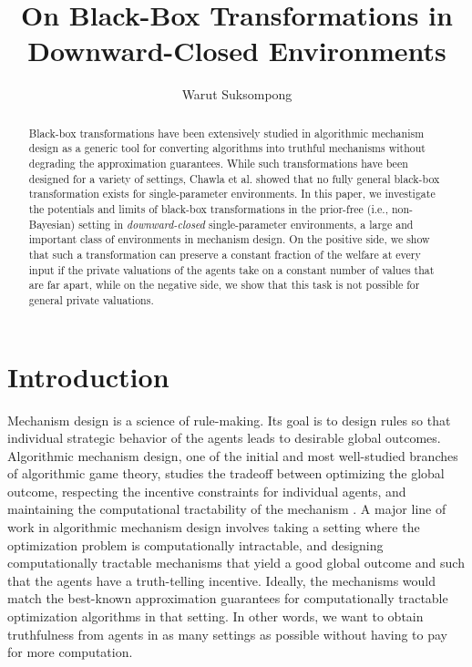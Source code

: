 \documentclass[runningheads,a4paper]{llncs}
\newcommand{\keywords}[1]{\par\addvspace\baselineskip
\noindent\keywordname\enspace\ignorespaces#1}
\begin{document}
\mainmatter  
\title{On Black-Box Transformations in Downward-Closed Environments}
\author{Warut Suksompong%
}
\maketitle

\begin{abstract}
Black-box transformations have been extensively studied in algorithmic mechanism design as a generic tool for converting algorithms into truthful mechanisms without degrading the approximation guarantees. While such transformations have been designed for a variety of settings, Chawla et al. showed that no fully general black-box transformation exists for single-parameter environments. In this paper, we investigate the potentials and limits of black-box transformations in the prior-free (i.e., non-Bayesian) setting in \emph{downward-closed} single-parameter environments, a large and important class of environments in mechanism design. On the positive side, we show that such a transformation can preserve a constant fraction of the welfare at every input if the private valuations of the agents take on a constant number of values that are far apart, while on the negative side, we show that this task is not possible for general private valuations.
\end{abstract}

\section{Introduction}

Mechanism design is a science of rule-making. Its goal is to design rules so that individual strategic behavior of the agents leads to desirable global outcomes. Algorithmic mechanism design, one of the initial and most well-studied branches of algorithmic game theory, studies the tradeoff between optimizing the global outcome, respecting the incentive constraints for individual agents, and maintaining the computational tractability of the mechanism \cite{NisanRo01}. A major line of work in algorithmic mechanism design involves taking a setting where the optimization problem is computationally intractable, and designing computationally tractable mechanisms that yield a good global outcome and such that the agents have a truth-telling incentive. Ideally, the mechanisms would match the best-known approximation guarantees for computationally tractable optimization algorithms in that setting. In other words, we want to obtain truthfulness from agents in as many settings as possible without having to pay for more computation.
\end{document}
